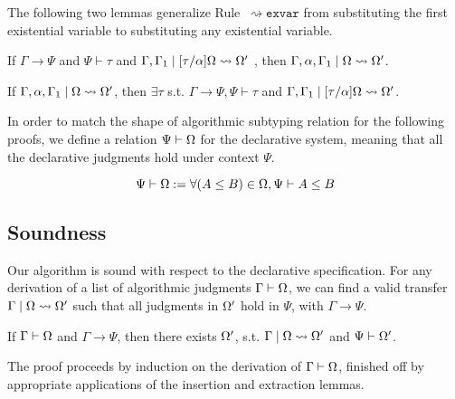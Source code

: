 The following two lemmas generalize Rule~$\mathtt{{\rightsquigarrow}exvar}$ from substituting the first
existential variable to substituting any existential variable.

\begin{lemma}[Insert]
If $\Gamma\to\Psi$ and $\Psi\vdash \tau$ and $\Gamma, \Gamma_1 \mid [\tau/\alpha]\Omega \rightsquigarrow \Omega'$
, then $\Gamma, \alpha, \Gamma_1\mid \Omega \rightsquigarrow \Omega'$.
\end{lemma}
\begin{lemma}[Extract]
	If $\Gamma, \alpha, \Gamma_1\mid \Omega \rightsquigarrow \Omega'$, then $\exists\tau$ s.t. $\Gamma\to\Psi, \Psi\vdash \tau$ and $\Gamma, \Gamma_1 \mid [\tau/\alpha]\Omega \rightsquigarrow \Omega'$.
\end{lemma}

In order to match the shape of algorithmic subtyping relation for the following proofs, we define a relation $\Psi\vdash \Omega$ for the declarative system, meaning that all the declarative judgments hold under context $\Psi$.
\begin{definition}
	$$\Psi\vdash\Omega := \forall (A\le B)\in \Omega, \Psi\vdash A\le B$$
\end{definition}


\subsection{Soundness}
Our algorithm is sound with respect to the
declarative specification. For any derivation of a list of algorithmic
judgments $\Gamma\vdash\Omega$, we can find a valid transfer
$\Gamma\mid\Omega\rightsquigarrow\Omega'$ such that all judgments in $\Omega'$ hold
in $\Psi$, with $\Gamma \to \Psi$.

\begin{theorem}[Soundness]
	If $\Gamma\vdash \Omega$ and $\Gamma \to \Psi$, then there exists $\Omega'$, s.t. $\Gamma \mid \Omega\rightsquigarrow \Omega'$ and $\Psi\vdash \Omega'$.
\end{theorem}
The proof proceeds by induction on the derivation
of $\Gamma\vdash\Omega$, finished off by appropriate applications of the insertion and
extraction lemmas.

